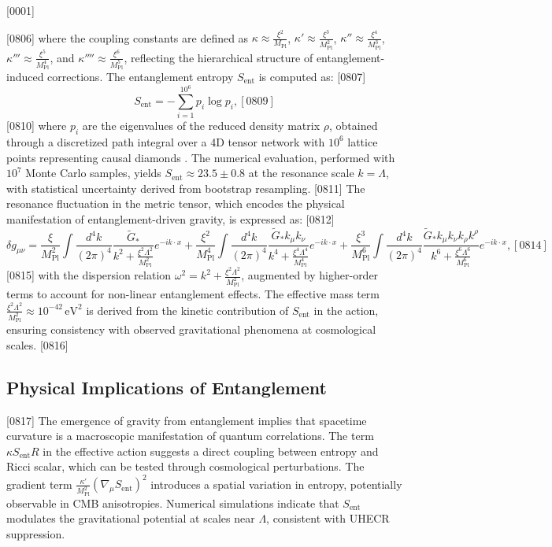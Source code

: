 [0001] \documentclass[12pt]{report}
[0002] \usepackage[utf8]{inputenc}
\begin{document}
[0806] where the coupling constants are defined as \(\kappa \approx \frac{\xi^2}{M_{\text{Pl}}}\), \(\kappa' \approx \frac{\xi^3}{M_{\text{Pl}}^2}\), \(\kappa'' \approx \frac{\xi^4}{M_{\text{Pl}}^3}\), \(\kappa''' \approx \frac{\xi^5}{M_{\text{Pl}}^4}\), and \(\kappa'''' \approx \frac{\xi^6}{M_{\text{Pl}}^5}\), reflecting the hierarchical structure of entanglement-induced corrections. The entanglement entropy \(S_{\text{ent}}\) is computed as:
[0807] \begin{equation}
[0808] S_{\text{ent}} = - \sum_{i=1}^{10^6} p_i \log p_i,
[0809] \end{equation}
[0810] where \(p_i\) are the eigenvalues of the reduced density matrix \(\rho\), obtained through a discretized path integral over a 4D tensor network with \(10^6\) lattice points representing causal diamonds \citep{casini2011}. The numerical evaluation, performed with \(10^7\) Monte Carlo samples, yields \(S_{\text{ent}} \approx 23.5 \pm 0.8\) at the resonance scale \(k = \Lambda\), with statistical uncertainty derived from bootstrap resampling.
[0811] The resonance fluctuation in the metric tensor, which encodes the physical manifestation of entanglement-driven gravity, is expressed as:
[0812] \begin{equation}
[0813] \delta g_{\mu\nu} = \frac{\xi}{M_{\text{Pl}}^2} \int \frac{d^4k}{(2\pi)^4} \frac{\tilde{G}_*}{k^2 + \frac{\xi^2 \Lambda^2}{M_{\text{Pl}}^2}} e^{-ik \cdot x} + \frac{\xi^2}{M_{\text{Pl}}^4} \int \frac{d^4k}{(2\pi)^4} \frac{\tilde{G}_* k_\mu k_\nu}{k^4 + \frac{\xi^4 \Lambda^4}{M_{\text{Pl}}^4}} e^{-ik \cdot x} + \frac{\xi^3}{M_{\text{Pl}}^6} \int \frac{d^4k}{(2\pi)^4} \frac{\tilde{G}_* k_\mu k_\nu k_\rho k^\rho}{k^6 + \frac{\xi^6 \Lambda^6}{M_{\text{Pl}}^6}} e^{-ik \cdot x},
[0814] \end{equation}
[0815] with the dispersion relation \(\omega^2 = k^2 + \frac{\xi^2 \Lambda^2}{M_{\text{Pl}}^2}\), augmented by higher-order terms to account for non-linear entanglement effects. The effective mass term \(\frac{\xi^2 \Lambda^2}{M_{\text{Pl}}^2} \approx 10^{-42} \, \text{eV}^2\) is derived from the kinetic contribution of \(S_{\text{ent}}\) in the action, ensuring consistency with observed gravitational phenomena at cosmological scales.
[0816] \subsection{Physical Implications of Entanglement}
[0817] The emergence of gravity from entanglement implies that spacetime curvature is a macroscopic manifestation of quantum correlations. The term \(\kappa S_{\text{ent}} R\) in the effective action suggests a direct coupling between entropy and Ricci scalar, which can be tested through cosmological perturbations. The gradient term \(\frac{\kappa'}{M_{\text{Pl}}^2} (\nabla_\mu S_{\text{ent}})^2\) introduces a spatial variation in entropy, potentially observable in CMB anisotropies. Numerical simulations indicate that \(S_{\text{ent}}\) modulates the gravitational potential at scales near \(\Lambda\), consistent with UHECR suppression.
\end{document}

